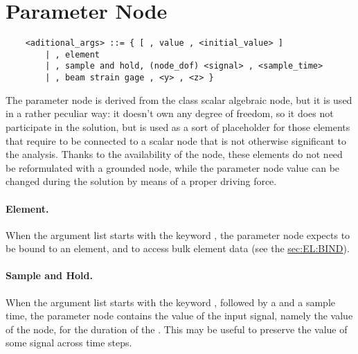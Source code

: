 \section{Parameter Node}
\label{sec:NODE:PARAMETER}
\begin{verbatim}
    <aditional_args> ::= { [ , value , <initial_value> ]
        | , element 
        | , sample and hold, (node_dof) <signal> , <sample_time>
        | , beam strain gage , <y> , <z> }
\end{verbatim}
The parameter node is derived from the class scalar algebraic node, but it
is used in a rather peculiar way: it doesn't own any degree of freedom,
so it does not participate in the solution, but is used as a sort of
placeholder for those elements that require to be connected to a scalar node
that is not otherwise significant to the analysis.
Thanks to the availability of the  node, these elements
do not need be reformulated with a grounded node, while the parameter
node value can be changed during the solution by means of a proper driving 
force.

\paragraph{Element.}
\label{sec:NODE:PARAMETER:ELEMENT}
When the argument list starts with the keyword , the parameter
node expects to be bound to an element, and to access bulk element data 
(see the \hyperref{\kwnd{bind} statement}{\kw{bind} statement, Section~}{}{sec:EL:BIND}).

\paragraph{Sample and Hold.}
\label{sec:NODE:PARAMETER:SAH}
When the argument list starts with the keyword ,
followed by a  and a sample time,
the parameter node contains the value of the input signal, namely
the value of the node, for the duration of the .
This may be useful to preserve the value of some signal across
time steps.


